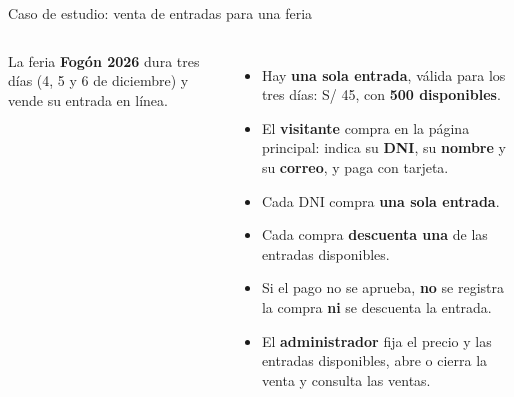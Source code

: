 \documentclass[aspectratio=169,10pt,c]{beamer}
\newcommand{\gris}[1]{\textcolor{utpGris}{#1}}
\begin{document}
\begin{frame}{Caso de estudio: venta de entradas para una feria}
\begin{columns}[T,onlytextwidth]
\small La feria \textbf{Fogón 2026} dura tres días (4, 5 y 6 de diciembre) y vende su entrada en línea.
\vspace{0.05cm}
\begin{itemize}\setlength\itemsep{2pt}\footnotesize
  \item Hay \textbf{una sola entrada}, válida para los tres días: S/ 45, con \textbf{500 disponibles}.
  \item El \textbf{visitante} compra en la página principal: indica su \textbf{DNI}, su \textbf{nombre} y su \textbf{correo}, y paga con tarjeta.
  \item Cada DNI compra \textbf{una sola entrada}.
  \item Cada compra \textbf{descuenta una} de las entradas disponibles.
  \item Si el pago no se aprueba, \textbf{no} se registra la compra \textbf{ni} se descuenta la entrada.
  \item El \textbf{administrador} fija el precio y las entradas disponibles, abre o cierra la venta y consulta las ventas.
\end{itemize}
\centering\renewcommand{\arraystretch}{0.9}
\end{columns}
\end{frame}
\end{document}
